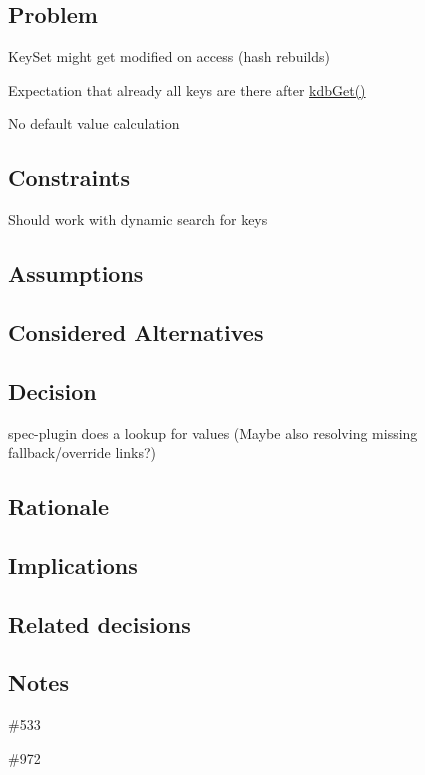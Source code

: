 \subsection*{Problem}


\begin{DoxyItemize}
\item Key\+Set might get modified on access (hash rebuilds)
\item Expectation that already all keys are there after {\ttfamily \hyperlink{group__kdb_ga28e385fd9cb7ccfe0b2f1ed2f62453a1}{kdb\+Get()}}
\item No default value calculation
\end{DoxyItemize}

\subsection*{Constraints}


\begin{DoxyItemize}
\item Should work with dynamic search for keys
\end{DoxyItemize}

\subsection*{Assumptions}

\subsection*{Considered Alternatives}

\subsection*{Decision}


\begin{DoxyItemize}
\item spec-\/plugin does a lookup for values (Maybe also resolving missing fallback/override links?)
\end{DoxyItemize}

\subsection*{Rationale}

\subsection*{Implications}

\subsection*{Related decisions}

\subsection*{Notes}


\begin{DoxyItemize}
\item \#533
\item \#972 
\end{DoxyItemize}